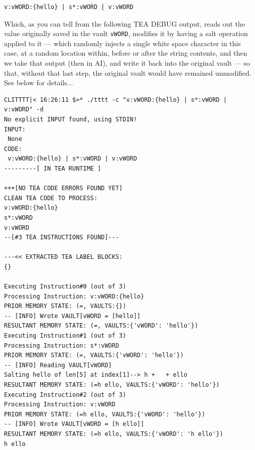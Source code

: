 \documentclass[a4paper, 18pt]{book} %
\begin{document}
{{{\vspace{2em}

  \begin{tcolorbox}[teaterminalstyle, title=V: EXAMPLE 1: Vault RMW, breakable]
  \begin{lstlisting}[language=TEA,breaklines=true,]
v:vWORD:{hello} | s*:vWORD | v:vWORD
   \end{lstlisting}
  \end{tcolorbox}

\vspace{2em}

Which, as you can tell from the following TEA DEBUG output, reads out the value originally saved in the vault \texttt{vWORD}, modifies it by having a salt operation applied to it --- which randomly injects a single white space character in this case, at a random location within, before or after the string contents, and then we take that output (then in AI), and write it back into the original vault --- so that, without that last step, the original vault would have remained unmodified. See below for details...


\vspace{2em}
  \begin{tcolorbox}[myterminalstyle, title=DEBUGGING a TEA memory RMW scenario]
  \begin{lstlisting}
CLITTTT|< 16:26:11 $>* ./tttt -c "v:vWORD:{hello} | s*:vWORD | v:vWORD" -d
No explicit INPUT found, using STDIN!
INPUT:
 None
CODE:
 v:vWORD:{hello} | s*:vWORD | v:vWORD
---------[ IN TEA RUNTIME ]

+++[NO TEA CODE ERRORS FOUND YET]
CLEAN TEA CODE TO PROCESS:
v:vWORD:{hello}
s*:vWORD
v:vWORD
--[#3 TEA INSTRUCTIONS FOUND]---

---<< EXTRACTED TEA LABEL BLOCKS:
{}

Executing Instruction#0 (out of 3)
Processing Instruction: v:vWORD:{hello}
PRIOR MEMORY STATE: (=, VAULTS:{})
-- [INFO] Wrote VAULT[vWORD = [hello]]
RESULTANT MEMORY STATE: (=, VAULTS:{'vWORD': 'hello'})
Executing Instruction#1 (out of 3)
Processing Instruction: s*:vWORD
PRIOR MEMORY STATE: (=, VAULTS:{'vWORD': 'hello'})
-- [INFO] Reading VAULT[vWORD]
Salting hello of len[5] at index[1]--> h +   + ello
RESULTANT MEMORY STATE: (=h ello, VAULTS:{'vWORD': 'hello'})
Executing Instruction#2 (out of 3)
Processing Instruction: v:vWORD
PRIOR MEMORY STATE: (=h ello, VAULTS:{'vWORD': 'hello'})
-- [INFO] Wrote VAULT[vWORD = [h ello]]
RESULTANT MEMORY STATE: (=h ello, VAULTS:{'vWORD': 'h ello'})
h ello                
  \end{lstlisting}
  \end{tcolorbox}
\vspace{2em}


}}}
\end{document}
